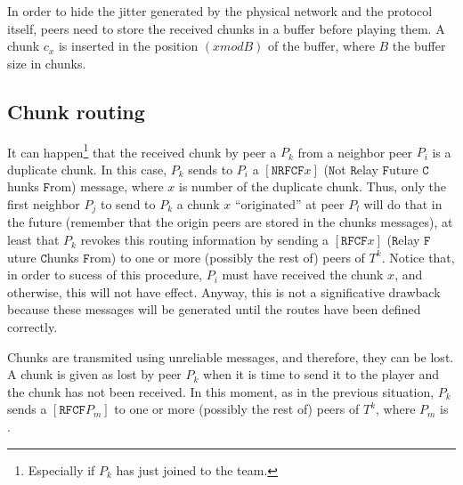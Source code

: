 In order to hide the jitter generated by the physical network and the
protocol itself, peers need to store the received chunks in a buffer
before playing them. A chunk $c_x$ is inserted in the position
$(x \mathit{mod} B)$ of the buffer, where $B$ the buffer size in
chunks.

\subsection{Chunk routing}
\label{sec:chunk_routing}
It can happen\footnote{Especially if $P_k$ has just joined to the
  team.} that the received chunk by peer a $P_k$ from a neighbor peer
$P_i$ is a duplicate chunk. In this case, $P_k$ sends to $P_i$ a
$[\mathtt{NRFCF} x]$ ($\mathtt{N}$ot $\mathtt{R}$elay
$\mathtt{F}$uture $\mathtt{C}$hunks $\mathtt{F}$rom) message, where
$x$ is number of the duplicate chunk. Thus, only the first neighbor
$P_j$ to send to $P_k$ a chunk $x$ ``originated'' at peer $P_l$ will
do that in the future (remember that the origin peers are stored in
the chunks messages), at least that $P_k$ revokes this routing
information by sending a $[\mathtt{RFCF} x]$ ($\mathtt{R}$elay
$\mathtt{F}$uture $\mathtt{C}$hunks $\mathtt{F}$rom) to one or more
(possibly the rest of) peers of $T^k$. Notice that, in order to sucess
of this procedure, $P_i$ must have received the chunk $x$, and
otherwise, this will not have effect. Anyway, this is not a
significative drawback because these messages will be generated until
the routes have been defined correctly.

Chunks are transmited using unreliable messages, and therefore, they
can be lost. A chunk is given as lost by peer $P_k$ when it is time to
send it to the player and the chunk has not been received. In this
moment, as in the previous situation, $P_k$ sends a $[\mathtt{RFCF}
  P_m]$ to one or more (possibly the rest of) peers of $T^k$, where
$P_m$ is .
